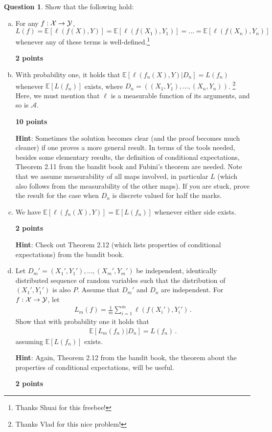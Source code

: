 \documentclass{article}
\DeclareMathOperator*{\1}{\mathbbm{1}}
\newcommand{\E}{\mathbb E}
\newcommand{\EE}[1]{\E[#1]}
\newcounter{DocPoints}
\newcounter{QuestionPoints}
\newcommand{\points}[1]{	\par\mbox{}\par\noindent\hfill {\bf #1 points}	\addtocounter{DocPoints}{#1}
	\addtocounter{QuestionPoints}{#1}
}
\theoremstyle{definition}
\newtheorem{question}{Question}
\theoremstyle{remark}
\newcommand{\hint}{\noindent \textbf{Hint}:\xspace}
\newcommand{\cA}{\mathcal{A}}
\begin{document}
\begin{question}
Show that the following hold:
\begin{enumerate}[(a)]
\item For any $f:\mathcal{X} \to \mathcal{Y}$, $L(f) = \EE{\ell(f(X),Y)} = \EE{\ell(f(X_1),Y_1)} = \dots = \EE{\ell(f(X_n),Y_n)}$ whenever any of these terms is well-defined.\footnote{Thanks Shuai for this freebee!}
\points{2}
\item \label{p:vlad} 
With probability one, it holds that $\EE{ \ell(f_n(X),Y) | D_n } = L(f_n)$ whenever $\EE{L(f_n)}$ exists,
where
$D_n = ((X_1,Y_1),\dots,(X_n,Y_n))$.
\footnote{Thanks Vlad for this nice problem!}
Here, we must mention that $\ell$ is a measurable function of its arguments, and so is $\cA$.
\points{10}

\hint 
Sometimes the solution becomes clear (and the proof becomes much cleaner) if one proves a more general result. In terms of the tools needed,  besides some elementary results, the definition of conditional expectations, Theorem 2.11 from the bandit book and Fubini's theorem are needed.
Note that we assume measurability of all maps involved, in particular $L$ (which also follows from the measurability of the other maps).
If you are stuck, prove the result for the case when $D_n$ is discrete valued for half the marks.

\item We have $\EE{\ell(f_n(X),Y)} = \EE{L(f_n)}$ whenever either side exists.
\points{2}

\hint Check out Theorem 2.12 (which lists properties of conditional expectations) from the bandit book.

\item \label{p:test} Let $D_m' = (X_1',Y_1'),\dots,(X_m',Y_m')$ be independent, identically distributed sequence of random variables such that the distribution of $(X_1',Y_1')$ is also $P$. Assume that $D_m'$ and $D_n$ are independent. For $f:\mathcal{X} \to \mathcal{Y}$, let 
\begin{align*}
L_m(f) = \frac1m \sum_{i=1}^m \ell( f(X_i'),Y_i')\,.
\end{align*}
Show that with probability one it holds that
\begin{align*}
\EE{L_m(f_n)|D_n}= L(f_n)\,.
\end{align*}
assuming $\EE{L(f_n)}$ exists.

\hint Again, Theorem 2.12 from the bandit book, the theorem about the properties of conditional expectations, will be useful.

\points{2}


\end{enumerate}
\end{question}
\end{document}
